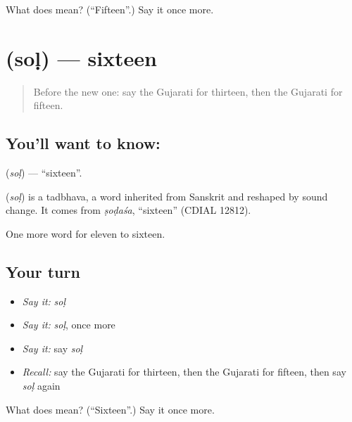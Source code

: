 \begin{tcolorbox}[breakable,colback=teal!4,colframe=teal!35!black,title={Before you move on}]
What does  mean? (\textquotedblleft{}Fifteen\textquotedblright{}.) Say it once more.
\end{tcolorbox}
\section[\texorpdfstring{\gu{સોળ} (soḷ)}{સોળ (soḷ)}]{ (soḷ) — sixteen}

\label{lesson:GU-C81-sixteen}



\begin{quote}
Before the new one: say the Gujarati for thirteen, then the Gujarati for fifteen.
\end{quote}

\subsection*{You'll want to know: }
\textbf{} (\emph{soḷ}) — \textquotedblleft{}sixteen\textquotedblright{}.

\begin{cousinweb}
\textbf{} (\emph{soḷ}) is a tadbhava, a word inherited from Sanskrit and reshaped by sound change. It comes from \emph{ṣoḍaśa}, \textquotedblleft{}sixteen\textquotedblright{} (CDIAL 12812).
\end{cousinweb}

\begin{grammarlens}[title={What you've built}]
One more word for eleven to sixteen.
\end{grammarlens}

\subsection*{Your turn}
\begin{itemize}
\raggedright
  \item \emph{Say it:} \emph{soḷ}
  \item \emph{Say it:} \emph{soḷ}, once more
  \item \emph{Say it:} say \emph{soḷ}
  \item \emph{Recall:} say the Gujarati for thirteen, then the Gujarati for fifteen, then say \emph{soḷ} again
\end{itemize}

\begin{tcolorbox}[breakable,colback=teal!4,colframe=teal!35!black,title={Before you move on}]
What does  mean? (\textquotedblleft{}Sixteen\textquotedblright{}.) Say it once more.
\end{tcolorbox}
